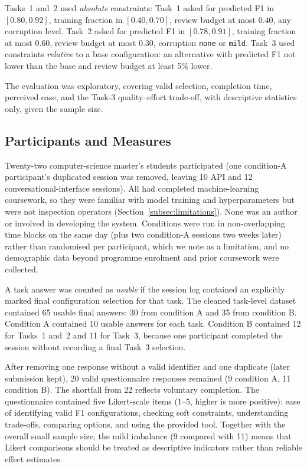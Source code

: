 \documentclass[final,5p,times,twocolumn]{elsarticle}
\begin{document}
Tasks~1 and~2 used \emph{absolute} constraints: Task~1 asked for
predicted F1 in $[0.80, 0.92]$, training fraction in $[0.40, 0.70]$,
review budget at most $0.40$, any corruption level. Task~2 asked for predicted F1 in $[0.78, 0.91]$, training fraction at most $0.60$,
review budget at most $0.30$, corruption \texttt{none} or
\texttt{mild}. Task~3 used constraints \emph{relative} to a base
configuration: an alternative with predicted F1 not lower than the base
and review budget at least 5\% lower.



The evaluation was exploratory, covering valid selection, completion
time, perceived ease, and the Task-3 quality--effort trade-off, with
descriptive statistics only, given the sample size.

\subsection{Participants and Measures}
\label{subsec:participants-measures}

Twenty-two computer-science master's students participated (one
condition-A participant's duplicated session was removed, leaving 10
API and 12 conversational-interface sessions). All had completed
machine-learning coursework, so they were familiar with model training
and hyperparameters but were not inspection operators
(Section~\ref{subsec:limitations}). None was an author or involved in
developing the system. Conditions were run in non-overlapping time blocks on the same day (plus two condition-A sessions two weeks later) rather than randomised per participant, which we note as a limitation, and no demographic data beyond programme enrolment and
prior coursework were collected.

A task answer was
counted as \emph{usable} if the session log contained an explicitly
marked final configuration selection for that task. The cleaned
task-level dataset contained 65 usable final answers: 30 from
condition A and 35 from condition B. Condition A contained 10 usable
answers for each task. Condition B contained 12 for Tasks~1 and~2 and
11 for Task~3, because one participant completed the session without
recording a final Task~3 selection.

After removing one response without a valid identifier and one
duplicate (later submission kept), 20 valid questionnaire responses
remained (9 condition A, 11 condition B). The shortfall from 22
reflects voluntary completion. The questionnaire contained five Likert-scale items
(1--5, higher is more positive): ease of identifying valid F1
configurations, checking soft constraints, understanding trade-offs,
comparing options, and using the provided tool. Together with the
overall small sample size, the mild imbalance (9 compared with 11) means that
Likert comparisons should be treated as descriptive indicators rather
than reliable effect estimates.
\end{document}
